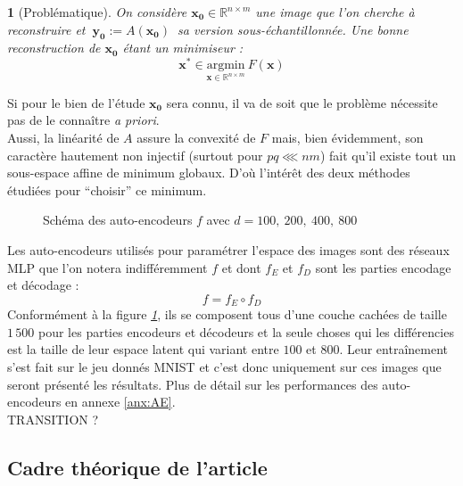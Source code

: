 \documentclass[hidelinks, french]{article} %
\newcommand{\R}{\mathbb{R}}
\newcommand{\apriori}{\textit{a priori}}
\newcommand{\argmin}[1]{\underset{#1}{\text{argmin}}}
\renewcommand{\bf}[1]{\boldsymbol{#1}}
\theoremstyle{enonce}
\theoremstyle{special}
\newtheorem{enonce}{}
\theoremstyle{rq}
\theoremstyle{exo}
\theoremstyle{demo}
\begin{document}
\begin{enonce}[Problématique]
On considère $\bf{x_0}\in\R^{n\times m}$ une image que l'on cherche à reconstruire et $\ \bf{y_0}:=A(\bf{x_0})\ $ sa version sous-échantillonnée. Une bonne reconstruction de $\bf{x_0}$ étant un minimiseur :
\begin{equation}\label{eq:probleme}
\bf{x^*}\in \argmin{\bf{x}\in\R^{n\times m}}\ F(\bf{x})\end{equation}\end{enonce}

Si pour le bien de l'étude $\bf{x_0}$ sera connu, il va de soit que le problème nécessite pas de le connaître \apriori.
\\
Aussi, la linéarité de $A$ assure la convexité de $F$ mais, bien évidemment, son caractère hautement non injectif (surtout pour $pq\lll nm$) fait qu'il existe tout un sous-espace affine de minimum globaux. D'où l'intérêt des deux méthodes étudiées pour ``choisir'' ce minimum.
\\

\begin{figure}%
    
    \caption{Schéma des auto-encodeurs  $f$ avec $d=100,\ 200,\ 400,\ 800$}
    \label{fig:AEschem}
\end{figure}

Les auto-encodeurs utilisés pour paramétrer l'espace des images sont des réseaux MLP que l'on notera indifféremment $f$ et dont $f_E$ et $f_D$ sont les parties encodage et décodage :
\[f = f_E\circ f_D\]
Conformément à la figure \textit{\ref{fig:AEschem}}, ils se composent tous d'une couche cachées de taille $1\,500$ pour les parties encodeurs et décodeurs et la seule choses qui les différencies est la taille de leur espace latent qui variant entre $100$ et $800$. Leur entraînement s'est fait sur le jeu donnés MNIST et c'est donc uniquement sur ces images que seront présenté les résultats. Plus de détail sur les performances des auto-encodeurs en annexe \ref{anx:AE}. 
\\ 

TRANSITION ?
\\




\subsection{Cadre théorique de l'article}\label{sec:article1/2}
\end{document}
